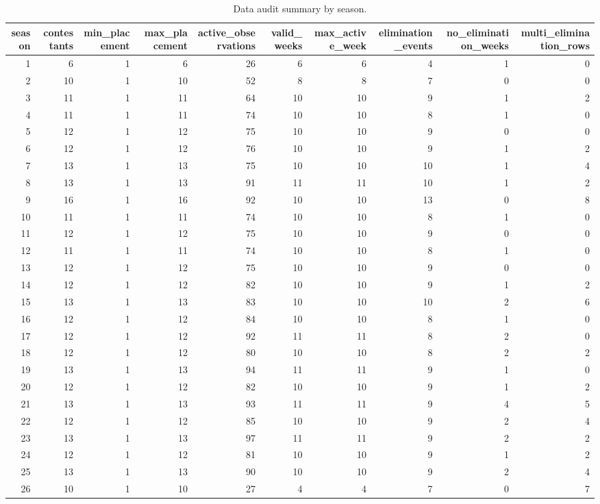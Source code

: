 \begin{table}
\caption{Data audit summary by season.}
\begin{tabular}{rrrrrrrrrr}
\toprule
season & contestants & min\_placement & max\_placement & active\_observations & valid\_weeks & max\_active\_week & elimination\_events & no\_elimination\_weeks & multi\_elimination\_rows \\
\midrule
1 & 6 & 1 & 6 & 26 & 6 & 6 & 4 & 1 & 0 \\
2 & 10 & 1 & 10 & 52 & 8 & 8 & 7 & 0 & 0 \\
3 & 11 & 1 & 11 & 64 & 10 & 10 & 9 & 1 & 2 \\
4 & 11 & 1 & 11 & 74 & 10 & 10 & 8 & 1 & 0 \\
5 & 12 & 1 & 12 & 75 & 10 & 10 & 9 & 0 & 0 \\
6 & 12 & 1 & 12 & 76 & 10 & 10 & 9 & 1 & 2 \\
7 & 13 & 1 & 13 & 75 & 10 & 10 & 10 & 1 & 4 \\
8 & 13 & 1 & 13 & 91 & 11 & 11 & 10 & 1 & 2 \\
9 & 16 & 1 & 16 & 92 & 10 & 10 & 13 & 0 & 8 \\
10 & 11 & 1 & 11 & 74 & 10 & 10 & 8 & 1 & 0 \\
11 & 12 & 1 & 12 & 75 & 10 & 10 & 9 & 0 & 0 \\
12 & 11 & 1 & 11 & 74 & 10 & 10 & 8 & 1 & 0 \\
13 & 12 & 1 & 12 & 75 & 10 & 10 & 9 & 0 & 0 \\
14 & 12 & 1 & 12 & 82 & 10 & 10 & 9 & 1 & 2 \\
15 & 13 & 1 & 13 & 83 & 10 & 10 & 10 & 2 & 6 \\
16 & 12 & 1 & 12 & 84 & 10 & 10 & 8 & 1 & 0 \\
17 & 12 & 1 & 12 & 92 & 11 & 11 & 8 & 2 & 0 \\
18 & 12 & 1 & 12 & 80 & 10 & 10 & 8 & 2 & 2 \\
19 & 13 & 1 & 13 & 94 & 11 & 11 & 9 & 1 & 0 \\
20 & 12 & 1 & 12 & 82 & 10 & 10 & 9 & 1 & 2 \\
21 & 13 & 1 & 13 & 93 & 11 & 11 & 9 & 4 & 5 \\
22 & 12 & 1 & 12 & 85 & 10 & 10 & 9 & 2 & 4 \\
23 & 13 & 1 & 13 & 97 & 11 & 11 & 9 & 2 & 2 \\
24 & 12 & 1 & 12 & 81 & 10 & 10 & 9 & 1 & 2 \\
25 & 13 & 1 & 13 & 90 & 10 & 10 & 9 & 2 & 4 \\
26 & 10 & 1 & 10 & 27 & 4 & 4 & 7 & 0 & 7 \\

\end{tabular}
\end{table}
